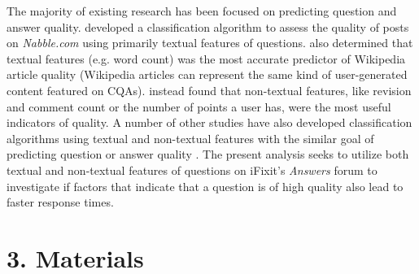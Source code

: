\documentclass{article}
\begin{document}
The majority of existing research has been focused on predicting question and answer quality. \cite{Weimer2007} developed a classification algorithm to assess the quality of posts on \textit{Nabble.com} using primarily textual features of questions. \cite{Blumenstock} also determined that textual features (e.g. word count) was the most accurate predictor of Wikipedia article quality (Wikipedia articles can represent the same kind of user-generated content featured on CQAs). \cite{H.fu} instead found that non-textual features, like revision and comment count or the number of points a user has, were the most useful indicators of quality. A number of other studies have also developed classification algorithms using textual and non-textual features with the similar goal of predicting question or answer quality \cite{Yao2015, Toba2014, Ponzanelli2014a, Ravi2014}. The present analysis seeks to utilize both textual and non-textual features of questions on iFixit's \textit{Answers} forum to investigate if factors that indicate that a question is of high quality also lead to faster response times.


\section*{3. Materials}
\end{document}
